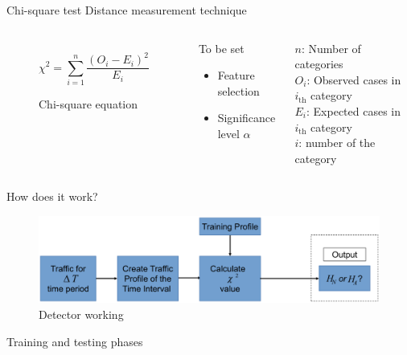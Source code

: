\documentclass{beamer}
\begin{document}
\begin{frame}{Chi-square test}
	Distance measurement technique
  \begin{columns}[T,onlytextwidth]
\begin{figure}
	\[{\chi}^2 = \sum_{i=1}^{n} \frac{(O_i - E_i)^2}{E_i}\]
		\caption{Chi-square equation}
\end{figure}
\begin{alertblock}{To be set}
	\begin{itemize}
		\item Feature selection
		\item Significance level $\alpha$
	\end{itemize}
\end{alertblock}
	  \vspace{2.3em}
	  $n$: Number of categories\\
	  $O_i$: Observed cases in $i_\text{th}$ category\\
	  $E_i$: Expected cases in $i_\text{th}$ category\\
	  $i$: number of the category\\
  \end{columns}
\end{frame}

\begin{frame}{How does it work?}
  \begin{figure}[t]
    \includegraphics[scale=0.26]{images/detector.png}
    \caption{Detector working}
  \end{figure}
	Training and testing phases
\end{frame}
\end{document}
